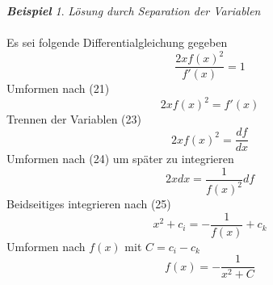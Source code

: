 \documentclass[a4paper,11pt]{article}
\theoremstyle{remark}
\newtheorem{example}{\textbf{Beispiel}}[section]
\begin{document}
\begin{example}{\textit{Lösung durch Separation der Variablen}} \\ \\
Es sei folgende Differentialgleichung gegeben
\begin{equation}
\frac{2xf(x)^2}{f'(x)}=1
\end{equation}
Umformen nach (21)
\begin{equation}
2xf(x)^2=f'(x)
\end{equation}
Trennen der Variablen (23)
\begin{equation}
2xf(x)^2=\frac{df}{dx}
\end{equation}
Umformen nach (24) um später zu integrieren
\begin{equation}
2xdx=\frac{1}{f(x)^2}df
\end{equation}
Beidseitiges integrieren nach (25)
\begin{equation}
x^2+c_i=-\frac{1}{f(x)}+c_k
\end{equation}
Umformen nach $f(x)$ mit $C=c_i-c_k$
\begin{equation}
f(x)=-\frac{1}{x^2+C}
\end{equation}

\end{example}
\end{document}
